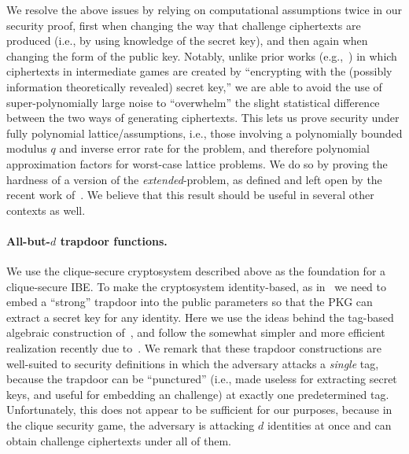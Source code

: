We resolve the above issues by relying on computational assumptions
twice in our security proof, first when changing the way that
challenge ciphertexts are produced (i.e., by using knowledge of the
secret key), and then again when changing the form of the public key.
Notably, unlike prior works
(e.g.,~\cite{DBLP:conf/innovations/GoldwasserKPV10,DBLP:conf/tcc/DodisGKPV10})
in which ciphertexts in intermediate games are created by ``encrypting
with the (possibly information theoretically revealed) secret key,''
we are able to avoid the use of super-polynomially large noise to
``overwhelm'' the slight statistical difference between the two ways
of generating ciphertexts.  This lets us prove security under fully
polynomial lattice/\lwe assumptions, i.e., those involving a
polynomially bounded modulus $q$ and inverse error rate for the \lwe
problem, and therefore polynomial approximation factors for worst-case
lattice problems.  We do so by proving the hardness of a version of
the \emph{extended}-\lwe problem, as defined and left open by the
recent work of~\cite{DBLP:conf/crypto/ONeillPW11}.  We believe that
this result should be useful in several other contexts as well.

\paragraph{All-but-$d$ trapdoor functions.}

We use the clique-secure cryptosystem described above as the
foundation for a clique-secure IBE.  To make the cryptosystem
identity-based, as in~\cite{DBLP:conf/stoc/GentryPV08} we need to
embed a ``strong'' trapdoor into the public parameters so that the PKG
can extract a secret key for any identity.  Here we use the ideas
behind the tag-based algebraic construction
of~\cite{DBLP:conf/eurocrypt/AgrawalBB10}, and follow the somewhat
simpler and more efficient realization recently due
to~\cite{DBLP:conf/eurocrypt/MicciancioP12}.  We remark that these
trapdoor constructions are well-suited to security definitions in
which the adversary attacks a \emph{single} tag, because the trapdoor
can be ``punctured'' (i.e., made useless for extracting secret keys,
and useful for embedding an \lwe challenge) at exactly one
predetermined tag.  Unfortunately, this does not appear to be
sufficient for our purposes, because in the clique security game, the
adversary is attacking $d$ identities at once and can obtain challenge
ciphertexts under all of them.


